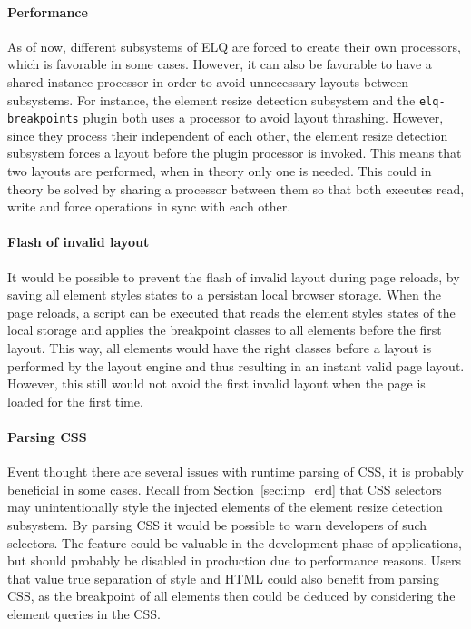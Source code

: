 \documentclass[a4paper,11pt]{kth-mag}
\newcommand{\code}[1]{\texttt{#1}}
\begin{document}
      \paragraph{Performance}
      As of now, different subsystems of \gls{ELQ} are forced to create their own  processors, which is favorable in some cases.
      However, it can also be favorable to have a shared instance  processor in order to avoid unnecessary layouts between subsystems.
      For instance, the element resize detection subsystem and the \code{elq-breakpoints} plugin both uses a  processor to avoid \gls{layout thrashing}.
      However, since they process their  independent of each other, the element resize detection subsystem forces a layout before the plugin  processor is invoked.
      This means that two layouts are performed, when in theory only one is needed.
      This could in theory be solved by sharing a  processor between them so that both executes read, write and force operations in sync with each other.

      \paragraph{Flash of invalid layout}
      It would be possible to prevent the flash of invalid layout during page reloads, by saving all element styles states to a persistan local \gls{browser} storage.
      When the page reloads, a script can be executed that reads the element styles states of the local storage and applies the breakpoint classes to all \glspl{element} before the first layout.
      This way, all \glspl{element} would have the right classes before a layout is performed by the \gls{layout engine} and thus resulting in an instant valid page layout.
      However, this still would not avoid the first invalid layout when the page is loaded for the first time.

      \paragraph{Parsing CSS}
      Event thought there are several issues with runtime parsing of CSS, it is probably beneficial in some cases.
      Recall from Section~\ref{sec:imp_erd} that CSS selectors may unintentionally style the injected \glspl{element} of the element resize detection subsystem.
      By parsing CSS it would be possible to warn developers of such selectors.
      The feature could be valuable in the development phase of applications, but should probably be disabled in production due to performance reasons.
      Users that value true separation of style and \gls{HTML} could also benefit from parsing CSS, as the breakpoint of all \glspl{element} then could be deduced by considering the element queries in the CSS.
\end{document}
